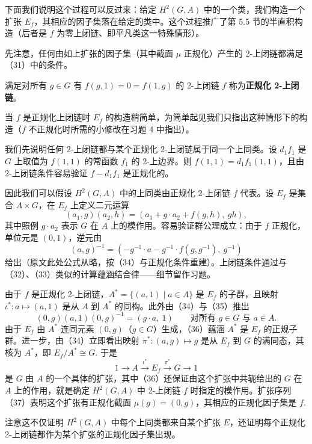 下面我们说明这个过程可以反过来：给定 \(H^2(G, A)\) 中的一个类，我们构造一个扩张 \(E_f\)，其相应的因子集落在给定的类中。这个过程推广了第 5.5 节的半直积构造（后者是 \(f\) 为零上闭链、即平凡类这一特殊情形）。

先注意，任何由如上扩张的因子集（其中截面 \(\mu\) 正规化）产生的 2-上闭链都满足（31）中的条件。

\begin{definition}
满足对所有 \(g \in G\) 有 \(f(g,1) = 0 = f(1,g)\) 的 2-上闭链 \(f\) 称为\textbf{正规化 2-上闭链}。
\end{definition}

当 \(f\) 是正规化上闭链时 \(E_f\) 的构造稍简单，为简单起见我们只指出这种情形下的构造（\(f\) 不正规化时所需的小修改在习题 4 中指出）。

我们先说明任何 2-上闭链都与某个正规化 2-上闭链属于同一个上同类。设 \(d_1f_1\) 是 \(G\) 上取值为 \(f(1,1)\) 的常函数 \(f_1\) 的 2-上边界。则 \(f(1,1) = d_1f_1(1,1)\)，且由 2-上闭链条件容易验证 \(f-d_1f_1\) 是正规化的。

因此我们可以假设 \(H^2(G, A)\) 中的上同类由正规化 2-上闭链 \(f\) 代表。设 \(E_f\) 是集合 \(A \times G\)，在 \(E_f\) 上定义二元运算
\[
(a_1, g)(a_2, h) = (a_1+g \cdot a_2+f(g,h),\ gh), \tag{17.34}
\]
其中照例 \(g \cdot a_2\) 表示 \(G\) 在 \(A\) 上的模作用。容易验证群公理成立：由于 \(f\) 正规化，单位元是 \((0,1)\)，逆元由
\[
(a, g)^{-1} = (-g^{-1} \cdot a-g^{-1} \cdot f(g, g^{-1}),\ g^{-1}) \tag{17.35}
\]
给出（原文此处公式从略，按（34）与正规化条件重建）。上闭链条件通过与（32）、（33）类似的计算蕴涵结合律——细节留作习题。

由于 \(f\) 是正规化 2-上闭链，\(A^* = \{(a,1) \mid a \in A\}\) 是 \(E_f\) 的子群，且映射 \(\iota^* : a \mapsto (a,1)\) 是从 \(A\) 到 \(A^*\) 的同构。此外由（34）与（35）推出
\[
(0, g)(a, 1)(0, g)^{-1} = (g \cdot a,\ 1) \qquad \text{对所有 } g \in G \text{ 与 } a \in A. \tag{17.36}
\]
由于 \(E_f\) 由 \(A^*\) 连同元素 \((0,g)\)（\(g \in G\)）生成，（36）蕴涵 \(A^*\) 是 \(E_f\) 的正规子群。进一步，由（34）立即看出映射 \(\pi^* : (a,g) \mapsto g\) 是从 \(E_f\) 到 \(G\) 的满同态，其核为 \(A^*\)，即 \(E_f/A^* \cong G\). 于是
\[
1 \to A \xrightarrow{\iota^*} E_f \xrightarrow{\pi^*} G \to 1 \tag{17.37}
\]
是 \(G\) 由 \(A\) 的一个具体的扩张，其中（36）还保证由这个扩张中共轭给出的 \(G\) 在 \(A\) 上的作用，就是确定 \(H^2(G, A)\) 中 2-上闭链 \(f\) 时指定的模作用。扩张序列（37）表明这个扩张有正规化截面 \(\mu(g) = (0,g)\)，其相应的正规化因子集是 \(f\).

注意这不仅证明 \(H^2(G, A)\) 中每个上同类都来自某个扩张 \(E\)，还证明每个正规化 2-上闭链都作为某个扩张的正规化因子集出现。

